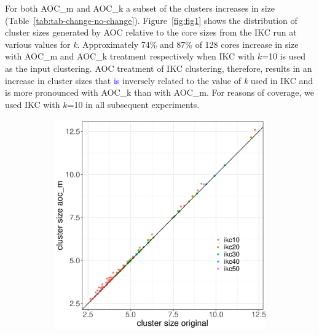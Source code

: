 \documentclass[12pt, oneside]{article}   	%
\begin{document}
{For both AOC\_m and AOC\_k a subset of the clusters increases in size (Table~\ref{tab:tab-change-no-change}). 
Figure~\ref{fig:fig1} shows the distribution of cluster sizes generated by AOC relative to the core sizes from the IKC run at various values for \emph{k}.  Approximately 74\% and 87\% of  128 cores increase in size with AOC\_m and AOC\_k treatment respectively when IKC with $k$=10 is used as the input clustering. AOC treatment of IKC clustering, therefore, results in an increase in cluster sizes that \textcolor{blue}{is} inversely related to the value of \emph{k} used in IKC and is more pronounced with AOC\_k than with AOC\_m. For reasons of coverage, we used IKC with $k$=10 in all subsequent experiments.
	
\begin{figure}[H]
\centering
\begin{subfigure}[t]{0.48\textwidth}
\centering
\includegraphics[width=\linewidth]{fig1b.pdf} 
\end{subfigure}
\hfill
\begin{subfigure}[t]{0.48\textwidth}
\centering

\end{subfigure}
\end{figure}}
\end{document}
